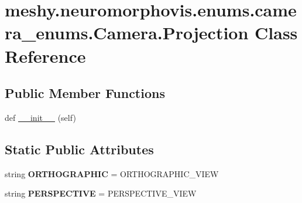 \hypertarget{classmeshy_1_1neuromorphovis_1_1enums_1_1camera__enums_1_1Camera_1_1Projection}{}\section{meshy.\+neuromorphovis.\+enums.\+camera\+\_\+enums.\+Camera.\+Projection Class Reference}
\label{classmeshy_1_1neuromorphovis_1_1enums_1_1camera__enums_1_1Camera_1_1Projection}


 


\subsection*{Public Member Functions}
\begin{DoxyCompactItemize}
\item 
def \hyperlink{classmeshy_1_1neuromorphovis_1_1enums_1_1camera__enums_1_1Camera_1_1Projection_ae3e95901e9df96a2874ac5bcc90de4fe}{\+\_\+\+\_\+init\+\_\+\+\_\+} (self)\hypertarget{classmeshy_1_1neuromorphovis_1_1enums_1_1camera__enums_1_1Camera_1_1Projection_ae3e95901e9df96a2874ac5bcc90de4fe}{}\label{classmeshy_1_1neuromorphovis_1_1enums_1_1camera__enums_1_1Camera_1_1Projection_ae3e95901e9df96a2874ac5bcc90de4fe}

\end{DoxyCompactItemize}
\subsection*{Static Public Attributes}
\begin{DoxyCompactItemize}
\item 
string {\bfseries O\+R\+T\+H\+O\+G\+R\+A\+P\+H\+IC} = \textquotesingle{}O\+R\+T\+H\+O\+G\+R\+A\+P\+H\+I\+C\+\_\+\+V\+I\+EW\textquotesingle{}\hypertarget{classmeshy_1_1neuromorphovis_1_1enums_1_1camera__enums_1_1Camera_1_1Projection_a8b4e66166dd2d18e8a3d2ccd9946c687}{}\label{classmeshy_1_1neuromorphovis_1_1enums_1_1camera__enums_1_1Camera_1_1Projection_a8b4e66166dd2d18e8a3d2ccd9946c687}

\item 
string {\bfseries P\+E\+R\+S\+P\+E\+C\+T\+I\+VE} = \textquotesingle{}P\+E\+R\+S\+P\+E\+C\+T\+I\+V\+E\+\_\+\+V\+I\+EW\textquotesingle{}\hypertarget{classmeshy_1_1neuromorphovis_1_1enums_1_1camera__enums_1_1Camera_1_1Projection_a8e0b75b31fd054504336f45eb61e032a}{}\label{classmeshy_1_1neuromorphovis_1_1enums_1_1camera__enums_1_1Camera_1_1Projection_a8e0b75b31fd054504336f45eb61e032a}

\end{DoxyCompactItemize}


